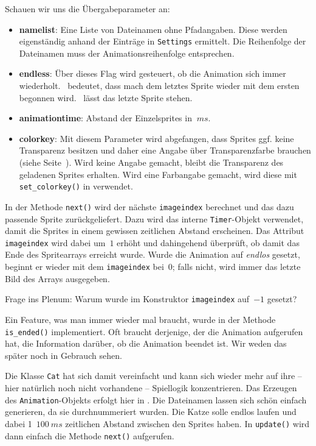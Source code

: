 Schauen wir uns die Übergabeparameter an: 
\begin{itemize}
    \item \textbf{namelist}: Eine Liste von Dateinamen ohne Pfadangaben. Diese werden eigenständig anhand der Einträge in \texttt{Settings} ermittelt. Die Reihenfolge der Dateinamen muss der Animationsreihenfolge entsprechen.

    \item \textbf{endless}: Über dieses Flag wird gesteuert, ob die Animation sich immer wiederholt. \true\ bedeutet, dass mach dem letztes Sprite wieder mit dem ersten begonnen wird. \false\ lässt das letzte Sprite stehen.

    \item \textbf{animationtime}: Abstand der Einzelsprites in $~ms$.

    \item \textbf{colorkey}: Mit diesem Parameter wird abgefangen, dass Sprites ggf. keine Transparenz besitzen und daher eine Angabe über Transparenzfarbe brauchen (siehe Seite~\pageref{pageTransparenz}). Wird keine Angabe gemacht, bleibt die Transparenz des geladenen Sprites erhalten. Wird eine Farbangabe gemacht, wird diese mit \texttt{set\_colorkey()} in  verwendet.
\end{itemize}

In der Methode \texttt{next()} wird der nächste \texttt{imageindex} berechnet und das dazu passende Sprite zurückgeliefert. Dazu wird das interne \texttt{Timer}-Objekt verwendet, damit die Sprites in einem gewissen zeitlichen Abstand erscheinen. Das Attribut \texttt{imageindex} wird dabei um~$1$ erhöht und dahingehend überprüft, ob damit das Ende des Spritearrays erreicht wurde. Wurde die Animation auf \emph{endlos} gesetzt, beginnt er wieder mit dem \texttt{imageindex} bei~$0$; falls nicht, wird immer das letzte Bild des Arrays ausgegeben.

Frage ins Plenum: Warum wurde im Konstruktor \texttt{imageindex} auf~$-1$ gesetzt?

Ein Feature, was man immer wieder mal braucht, wurde in der Methode \texttt{is\_ended()} implementiert. Oft braucht derjenige, der die Animation aufgerufen hat, die Information darüber, ob die Animation beendet ist. Wir weden das später noch in Gebrauch sehen.


Die Klasse \texttt{Cat} hat sich damit vereinfacht und kann sich wieder mehr auf ihre -- hier natürlich noch nicht vorhandene -- Spiellogik konzentrieren. Das Erzeugen des \texttt{Animation}-Objekts erfolgt hier in . Die Dateinamen lassen sich schön einfach generieren, da sie durchnummeriert wurden. Die Katze solle endlos laufen und dabei 1~$100~ms$ zeitlichen Abstand zwischen den Sprites haben. In \texttt{update()} wird dann einfach die Methode \texttt{next()} aufgerufen.


